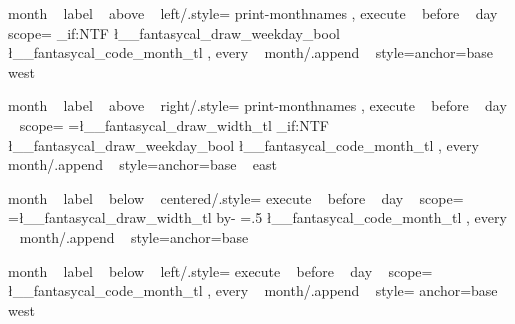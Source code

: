 \tikzset
  {
    month ~ label ~ above ~ left/.style=
      {
        print-monthnames ,
        execute ~ before ~ day ~ scope=
          {
              {
                {
                  \bool_if:NTF \l__fantasycal_draw_weekday_bool
                    {  }
                    {  }
                  \l__fantasycal_code_month_tl%
                }
              } 
          }
        ,
        every ~ month/.append ~ style={anchor=base ~ west}
      }
  }



\tikzset
  {
    month ~ label ~ above ~ right/.style=
      {
        print-monthnames ,
        execute ~ before ~ day ~ scope=
          {
              {
                {
                  \pgf@xb=\l__fantasycal_draw_width_tl\pgf@xa%
                  \pgftransformxshift{\pgf@xb}
                  \bool_if:NTF \l__fantasycal_draw_weekday_bool
                    {  }
                    {  }
                  \l__fantasycal_code_month_tl%
                }
              } 
          }
        ,
        every ~ month/.append ~ style={anchor=base ~ east}
      }
  }

\tikzset
  {
    month ~ label ~ below ~ centered/.style=
      {
        execute ~ before ~ day ~ scope=
          {
              {
                {
                  \pgf@xb=\l__fantasycal_draw_width_tl\pgf@xa%
                  \advance\pgf@xb by-\pgf@xa%
                  \pgf@xb=.5\pgf@xb%
                  \pgftransformxshift{\pgf@xb}
                  \pgftransformxshift{-1.5ex}
                  \l__fantasycal_code_month_tl%
                }
              } 
          }
        ,
        every ~ month/.append ~ style={anchor=base}
      }
  }

\tikzset
  {
    month ~ label ~ below ~ left/.style=
      {
        execute ~ before ~ day ~ scope=
          {
              {
                {
                  \l__fantasycal_code_month_tl%
                }
              }
          }
        ,
      every ~ month/.append ~ style={ anchor=base ~ west}
    }
  }









